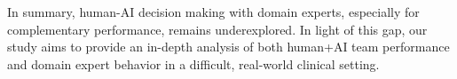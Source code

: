 In summary, human-AI decision making with domain experts, especially for complementary performance, remains underexplored. In light of this gap, our study aims to provide an in-depth analysis of both human+AI team performance and domain expert behavior in a difficult, real-world clinical setting.




































